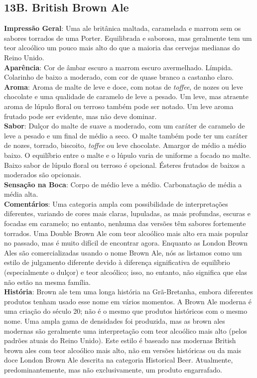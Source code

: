 \subsection*{13B. British Brown Ale}
\textbf{Impressão Geral}: Uma ale britânica maltada, caramelada e marrom sem os sabores torrados de uma Porter. Equilibrada e saborosa, mas geralmente tem um teor alcoólico um pouco mais alto do que a maioria das cervejas medianas do Reino Unido. \\
\textbf{Aparência}: Cor de âmbar escuro a marrom escuro avermelhado. Límpida. Colarinho de baixo a moderado, com cor de quase branco a castanho claro. \\
\textbf{Aroma}: Aroma de malte de leve e doce, com notas de \textit{toffee}, de nozes ou leve chocolate e uma qualidade de caramelo de leve a pesado. Um leve, mas atraente aroma de lúpulo floral ou terroso também pode ser notado. Um leve aroma frutado pode ser evidente, mas não deve dominar. \\
\textbf{Sabor}: Dulçor do malte de suave a moderado, com um caráter de caramelo de leve a pesado e um final de médio a seco. O malte também pode ter um caráter de nozes, torrado, biscoito, \textit{toffee} ou leve chocolate. Amargor de médio a médio baixo. O equilíbrio entre o malte e o lúpulo varia de uniforme a focado no malte. Baixo sabor de lúpulo floral ou terroso é opcional. Ésteres frutados de baixos a moderados são opcionais. \\
\textbf{Sensação na Boca}: Corpo de médio leve a médio. Carbonatação de média a média alta. \\
\textbf{Comentários}: Uma categoria ampla com possibilidade de interpretações diferentes, variando de cores mais claras, lupuladas, as mais profundas, escuras e focadas em caramelo; no entanto, nenhuma das versões têm sabores fortemente torrados. Uma Double Brown Ale com teor alcoólico mais alto era mais popular no passado, mas é muito difícil de encontrar agora. Enquanto as London Brown Ales são comercializadas usando o nome Brown Ale, nós as listamos como um estilo de julgamento diferente devido à diferença significativa de equilíbrio (especialmente o dulçor) e teor alcoólico; isso, no entanto, não significa que elas não estão na mesma família. \\
\textbf{História}: Brown ale tem uma longa história na Grã-Bretanha, embora diferentes produtos tenham usado esse nome em vários momentos. A Brown Ale moderna é uma criação do século 20; não é o mesmo que produtos históricos com o mesmo nome. Uma ampla gama de densidades foi produzida, mas as brown ales modernas são geralmente uma interpretação com teor alcoólico mais alto (pelos padrões atuais do Reino Unido). Este estilo é baseado nas modernas British brown ales com teor alcoólico mais alto, não em versões históricas ou da mais doce London Brown Ale descrita na categoria Historical Beer. Atualmente, predominantemente, mas não exclusivamente, um produto engarrafado. \\
